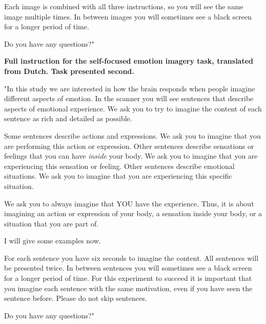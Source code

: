 \documentclass[11pt,american,]{memoir} %
\begin{document}
Each image is combined with all three instructions, so you will see the same image multiple times. In between images you will sometimes see a black screen for a longer period of time.

Do you have any questions?"

\textbf{Full instruction for the self-focused emotion imagery task, translated from Dutch. Task presented second.}

"In this study we are interested in how the brain responds when people imagine different aspects of emotion. In the scanner you will see sentences that describe aspects of emotional experience. We ask you to try to imagine the content of each sentence as rich and detailed as possible.

Some sentences describe actions and expressions. We ask you to imagine that you are performing this action or expression. Other sentences describe sensations or feelings that you can have \emph{inside} your body. We ask you to imagine that you are experiencing this sensation or feeling. Other sentences describe emotional situations. We ask you to imagine that you are experiencing this specific situation.

We ask you to always imagine that YOU have the experience. Thus, it is about imagining an action or expression of your body, a sensation inside your body, or a situation that you are part of.

I will give some examples now.

For each sentence you have six seconds to imagine the content. All sentences will be presented twice. In between sentences you will sometimes see a black screen for a longer period of time. For this experiment to succeed it is important that you imagine each sentence with the same motivation, even if you have seen the sentence before. Please do not skip sentences.

Do you have any questions?"
\end{document}

